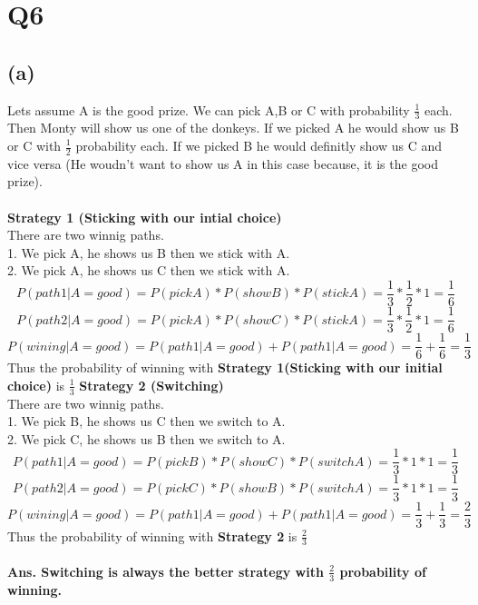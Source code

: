 \documentclass[a4paper,11pt]{article}
\begin{document}
\section*{Q6}
\subsection*{(a)}
Lets assume A is the good prize. We can pick A,B or C with probability $\frac{1}{3}$ each. Then Monty will show us one of the donkeys. If we picked A he would show us B or C with $\frac{1}{2}$ probability each. If we picked B he would definitly show us C and vice versa (He woudn't want to  show us A in this case because, it is the good prize).\\\\
\textbf{Strategy 1 (Sticking with our intial choice)}\\
There are two winnig paths.\\
1. We pick A, he shows us B then we stick with A.\\
2. We pick A, he shows us C then we stick with A.\\
$$P(path1|A=good)  = P(pickA)*P(showB)*P(stickA) = \frac{1}{3}*\frac{1}{2}*1=\frac{1}{6}$$
$$P(path2|A=good)  = P(pickA)*P(showC)*P(stickA) = \frac{1}{3}*\frac{1}{2}*1=\frac{1}{6}$$
$$P(wining|A=good) = P(path1|A=good)+P(path1|A=good)=\frac{1}{6} + \frac{1}{6}=\frac{1}{3}$$
Thus the probability of winning with \textbf{Strategy 1(Sticking with our initial choice)} is \textbf{$\frac{1}{3}$}
\textbf{Strategy 2 (Switching)}\\
There are two winnig paths.\\
1. We pick B, he shows us C then we switch to A.\\
2. We pick C, he shows us B then we switch to A.\\
$$P(path1|A=good)  = P(pickB)*P(showC)*P(switchA) = \frac{1}{3}*1*1=\frac{1}{3}$$
$$P(path2|A=good)  = P(pickC)*P(showB)*P(switchA) = \frac{1}{3}*1*1=\frac{1}{3}$$
$$P(wining|A=good) = P(path1|A=good)+P(path1|A=good)=\frac{1}{3} + \frac{1}{3}=\frac{2}{3}$$
Thus the probability of winning with \textbf{Strategy 2} is \textbf{$\frac{2}{3}$}\\\\
\textbf{Ans. Switching is always the better strategy with $\frac{2}{3}$ probability of winning.}
\end{document}
